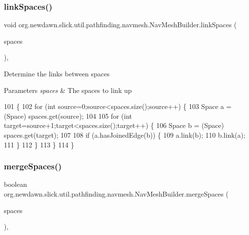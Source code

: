 \subsubsection{\texorpdfstring{link\+Spaces()}{linkSpaces()}}
{\footnotesize\ttfamily void org.\+newdawn.\+slick.\+util.\+pathfinding.\+navmesh.\+Nav\+Mesh\+Builder.\+link\+Spaces (\begin{DoxyParamCaption}\item[{Array\+List}]{spaces }\end{DoxyParamCaption})\hspace{0.3cm}{\ttfamily [inline]}, {\ttfamily [private]}}

Determine the links between spaces


\begin{DoxyParams}{Parameters}
{\em spaces} & The spaces to link up \\
\hline
\end{DoxyParams}

\begin{DoxyCode}
101                                               \{
102         \textcolor{keywordflow}{for} (\textcolor{keywordtype}{int} source=0;source<spaces.size();source++) \{
103             Space a = (Space) spaces.get(source);
104             
105             \textcolor{keywordflow}{for} (\textcolor{keywordtype}{int} target=source+1;target<spaces.size();target++) \{
106                 Space b = (Space) spaces.get(target);
107                 
108                 \textcolor{keywordflow}{if} (a.hasJoinedEdge(b)) \{
109                     a.link(b);
110                     b.link(a);
111                 \}
112             \}
113         \}
114     \}
\end{DoxyCode}
\mbox{\label{classorg_1_1newdawn_1_1slick_1_1util_1_1pathfinding_1_1navmesh_1_1_nav_mesh_builder_a4d33879ab429fd9f48772a1c163b47d2}} 
\subsubsection{\texorpdfstring{merge\+Spaces()}{mergeSpaces()}}
{\footnotesize\ttfamily boolean org.\+newdawn.\+slick.\+util.\+pathfinding.\+navmesh.\+Nav\+Mesh\+Builder.\+merge\+Spaces (\begin{DoxyParamCaption}\item[{Array\+List}]{spaces }\end{DoxyParamCaption})\hspace{0.3cm}{\ttfamily [inline]}, {\ttfamily [private]}}

